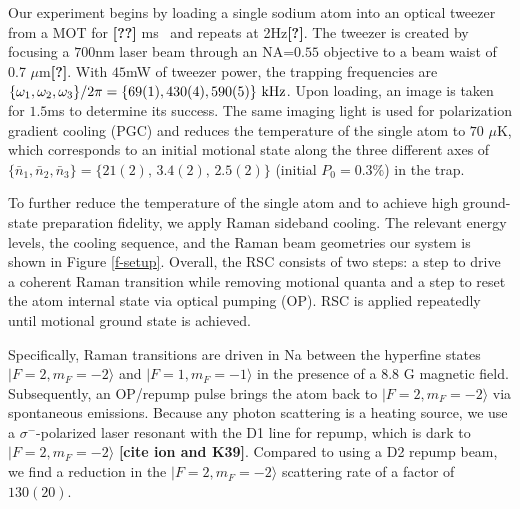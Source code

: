 \documentclass[aps,prl,twocolumn,groupedaddress]{revtex4-1}
\newcommand{\fxnote}[1]{{\textbf{[#1]}}}
\begin{document}
Our experiment begins by loading a single sodium atom into an optical tweezer from a MOT
for \fxnote{??} ms~\cite{Hutzler2017-LightShifts} and repeats at 2Hz\fxnote{?}.
The tweezer is created by focusing a $700$nm laser beam through an NA=$0.55$ objective to
a beam waist of 0.7 $\mu$m\fxnote{?}.
With $45$mW of tweezer power, the trapping frequencies are
$\{\omega_1,\omega_2,\omega_3\}/2\pi = \{69(1), 430(4), 590(5)\}\ \text{\text{kHz}}$.
Upon loading, an image is taken for $1.5$ms to determine its success.
The same imaging light is used for polarization gradient cooling (PGC) and
reduces the temperature of the single atom to $70$ $\mu$K,
which corresponds to an initial motional state along the three different axes of
$\{\bar n_1, \bar n_2, \bar n_3\}=\{21(2),\, 3.4(2),\, 2.5(2)\}$ (initial $P_0=0.3\%$) in the trap.

To further reduce the temperature of the single atom and
to achieve high ground-state preparation fidelity, we apply Raman sideband cooling.
The relevant energy levels, the cooling sequence, and the Raman beam geometries our system
is shown in Figure \ref{f-setup}. Overall, the RSC consists of two steps:
a step to drive a coherent Raman transition while removing motional quanta and
a step to reset the atom internal state via optical pumping (OP).
RSC is applied repeatedly until motional ground state is achieved.

Specifically, Raman transitions are driven in Na between the hyperfine states
$|F=2, m_F=-2\rangle$ and  $|F=1, m_F=-1\rangle$ in the presence of a $8.8$ G magnetic field.
Subsequently, an OP/repump pulse brings the atom back to $|F=2, m_F=-2\rangle$
via spontaneous emissions.
Because any photon scattering is a heating source,
we use a $\sigma^-$-polarized laser resonant with the D1 line for repump,
which is dark to $|F=2, m_F=-2\rangle$ \fxnote{cite ion and K39}.
Compared to using a D2 repump beam, we find a reduction in the $|F=2, m_F=-2\rangle$
scattering rate of a factor of $130(20)$.
\end{document}
